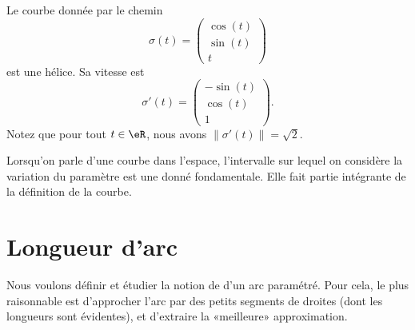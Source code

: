 \begin{example}
    Le courbe donnée par le chemin
    \begin{equation}
        \sigma(t)=\begin{pmatrix}
            \cos(t)    \\ 
            \sin(t)    \\ 
            t    
        \end{pmatrix}
    \end{equation}
    est une hélice. Sa vitesse est
    \begin{equation}
        \sigma'(t)=\begin{pmatrix}
            -\sin(t)    \\ 
            \cos(t)    \\ 
            1    
        \end{pmatrix}.
    \end{equation}
    Notez que pour tout $t\in\eR$, nous avons $\| \sigma'(t) \|=\sqrt{2}$.
\end{example}

\begin{remark}
    Lorsqu'on parle d'une courbe dans l'espace, l'intervalle sur lequel on considère la variation du paramètre est une donné fondamentale. Elle fait partie intégrante de la définition de la courbe.
\end{remark}


\section{Longueur d'arc}        \label{SecLongArc}

Nous voulons définir et étudier la notion de  d'un arc paramétré. Pour cela, le plus raisonnable est d'approcher l'arc par des petits segments de droites (dont les longueurs sont évidentes), et d'extraire la «meilleure» approximation.

